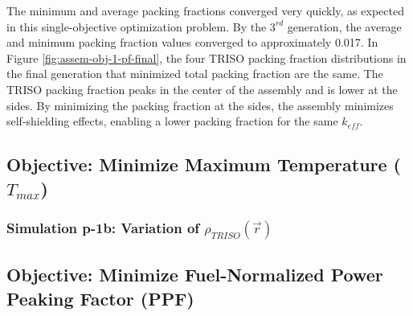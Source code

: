 The minimum and average packing fractions converged very quickly, as expected 
in this single-objective optimization problem.
By the $3^{rd}$ generation, the average and minimum packing fraction
values converged to approximately 0.017. 
In Figure \ref{fig:assem-obj-1-pf-final}, the four TRISO packing fraction distributions in the
final generation that minimized total packing fraction are the same.
The TRISO packing fraction peaks in the center of the assembly and is lower at the sides. 
By minimizing the packing fraction at the sides, the assembly minimizes self-shielding effects, 
enabling a lower packing fraction for the same $k_{eff}$. 

\subsection{Objective: Minimize Maximum Temperature ($T_{max}$)}
\subsubsection{Simulation p-1b: Variation of $\rho_{TRISO}(\vec{r})$}

\subsection{Objective: Minimize Fuel-Normalized Power Peaking Factor (PPF)}
